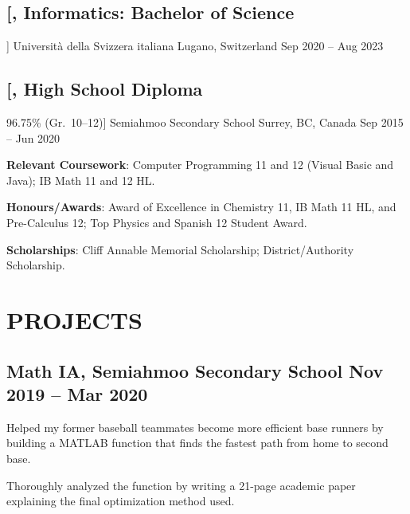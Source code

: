 \documentclass{article}
\newcommand{\datedsubsection}[4][]{
    \subsection*{
        \textbf{\large #2}, #3 \hfill #4
    } %
    \vspace{-4pt} %
    #1 %
}
\begin{document}
{    %
    
    \datedsubsection
        [\textit{Informatics: Bachelor of Science}]
        {Universit\`a della Svizzera italiana}
        {Lugano, Switzerland}
        {Sep 2020 -- Aug 2023}
    
    
    
    \datedsubsection
        [\textit{High School Diploma} 
        \hfill 96.75\% (Gr.\ 10--12)]
        {Semiahmoo Secondary School}
        {Surrey, BC, Canada}
        {Sep 2015 -- Jun 2020}
    
    \begin{compactitem}
    
    \item\textbf{Relevant Coursework}:
    Computer Programming 11 and 12 (Visual Basic and Java);
    IB Math 11 and 12 HL.
    
    \item\textbf{Honours/Awards}:
    Award of Excellence in Chemistry 11, IB Math 11 HL, and Pre-Calculus 12;
    Top Physics and Spanish 12 Student Award.
    
    \item\textbf{Scholarships}:
    Cliff Annable Memorial Scholarship;
    District/Authority Scholarship.
    
    \end{compactitem}
    
    
    
    
    \section{PROJECTS}
    
    
    \datedsubsection{Math IA}
                    {Semiahmoo Secondary School}
                    {Nov 2019 -- Mar 2020}
    
    \begin{compactitem}
    \item Helped my former baseball teammates become more efficient base runners by building a MATLAB function that finds the fastest path from home to second base.
    \item Thoroughly analyzed the function by writing a 21-page academic paper explaining the final optimization method used.
    \end{compactitem}
    
}
\end{document}
